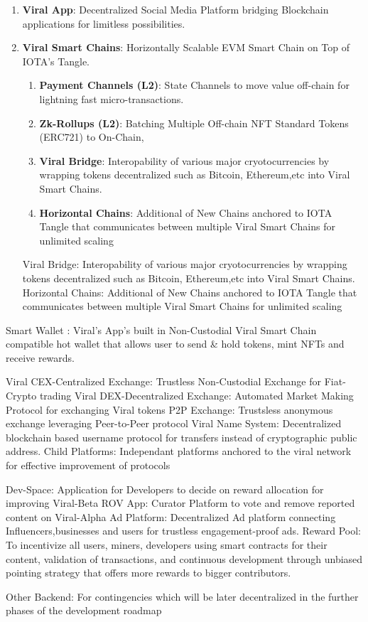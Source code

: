 \documentclass[10pt]{article}
\begin{document}
\begin{enumerate}

\item \textbf{Viral App}: Decentralized Social Media Platform bridging Blockchain applications for limitless possibilities.

\item \textbf{Viral Smart Chains}: Horizontally Scalable EVM Smart Chain on Top of IOTA's Tangle.

\begin{enumerate}

	\item \textbf{Payment Channels (L2)}: State Channels to move value off-chain for lightning fast micro-transactions.

	\item \textbf{Zk-Rollups (L2)}: Batching Multiple Off-chain NFT Standard Tokens (ERC721) to On-Chain,
	\item \textbf{Viral Bridge}: Interopability of various major cryotocurrencies by wrapping tokens decentralized such as Bitcoin, Ethereum,etc into Viral Smart Chains.
	\item \textbf{Horizontal Chains}: Additional of New Chains anchored to IOTA Tangle that communicates between multiple Viral Smart Chains for unlimited scaling

\end{enumerate}
	
Viral Bridge: Interopability of various major cryotocurrencies by wrapping tokens decentralized such as Bitcoin, Ethereum,etc into Viral Smart Chains.
Horizontal Chains: Additional of New Chains anchored to IOTA Tangle that communicates between multiple Viral Smart Chains for unlimited scaling

\end{enumerate}


Smart Wallet : Viral's App's built in Non-Custodial Viral Smart Chain compatible hot wallet that allows user to send \& hold tokens, mint NFTs and receive rewards.

Viral CEX-Centralized Exchange: Trustless Non-Custodial Exchange for Fiat-Crypto trading
Viral DEX-Decentralized Exchange: Automated Market Making Protocol for exchanging Viral tokens
P2P Exchange: Trustsless anonymous exchange leveraging Peer-to-Peer protocol
Viral Name System: Decentralized blockchain based username protocol for transfers instead of cryptographic public address.
Child Platforms: Independant platforms anchored to the viral network for effective improvement of protocols

Dev-Space: Application for Developers to decide on reward allocation for improving Viral-Beta
ROV App: Curator Platform to vote and remove reported content on Viral-Alpha
Ad Platform: Decentralized Ad platform connecting Influencers,businesses and users for trustless engagement-proof ads.
Reward Pool: To incentivize all users, miners, developers using smart contracts for their content, validation of transactions, and continuous development through unbiased pointing strategy that offers more rewards to bigger contributors.

Other Backend: For contingencies which will be later decentralized in the further phases of the development roadmap
\end{document}
